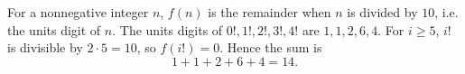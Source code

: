For a nonnegative integer $n$, $f(n)$ is the remainder when $n$ is divided by $10$, i.e. the units digit of $n$. The units digits of $0!,1!,2!,3!,4!$ are $1,1,2,6,4$. For $i\ge5$, $i!$ is divisible by $2\cdot5=10$, so $f(i!)=0$. Hence the sum is
\[1+1+2+6+4=\boxed{14}.\]
